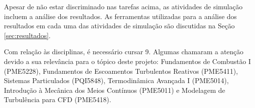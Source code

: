 Apesar de não estar discriminado nas tarefas acima, as atividades de simulação incluem a análise dos resultados. 
As ferramentas utilizadas para a análise dos resultados em cada uma das atividades de simulação são discutidas na Seção \ref{sec:resultados}.

Com relação às disciplinas, é necessário cursar 9.
Algumas chamaram a atenção devido a sua relevância para o tópico deste projeto: Fundamentos de Combustão I (PME5228), Fundamentos de Escoamentos Turbulentos Reativos  (PME5411), Sistemas Particulados (PQI5848), Termodinâmica Avançada I (PME5014), Introdução à Mecânica dos Meios Contínuos (PME5011) e Modelagem de Turbulência para CFD (PME5418).




